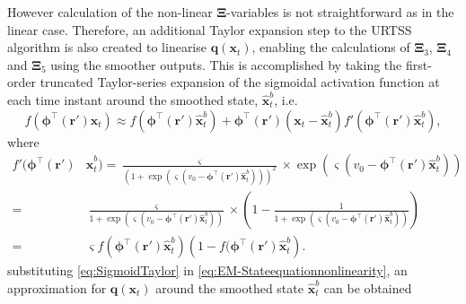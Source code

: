 \documentclass[]{article}
\begin{document}
However calculation of the non-linear $\boldsymbol\Xi$-variables is not straightforward as in the linear case. Therefore, an additional Taylor expansion step to the URTSS algorithm is also created to linearise $\mathbf q(\mathbf{x}_t)$, enabling the  calculations of $\boldsymbol\Xi_3$, $\boldsymbol\Xi_4$ and $\boldsymbol\Xi_5$ using the smoother outputs. This is accomplished by taking the first-order truncated Taylor-series expansion of the sigmoidal activation function at each time instant  around the smoothed state, $\hat{\mathbf x}_t^b$, i.e.
\begin{equation}\label{eq:SigmoidTaylor}
 f\left(\boldsymbol \phi^\top\left(\mathbf r'\right)\mathbf x_t\right) \approx f\left(\boldsymbol \phi^\top(\mathbf r')\hat{\mathbf x}_t^b\right)+  \boldsymbol \phi^\top\left(\mathbf r'\right)\left(\mathbf x_t - \hat{\mathbf x}_t^b\right)f'\left(\boldsymbol \phi^\top\left(\mathbf r'\right)\hat{\mathbf x}_t^b\right),
\end{equation}
where 
 \begin{align}\label{eq:SigmoidDerivative}
  f'(\boldsymbol \phi^\top\left(\mathbf r'\right)&\hat{\mathbf x}_t^b)= \frac{\varsigma}{\left(1 + \exp \left( \varsigma \left( v_0 - \boldsymbol \phi^\top\left(\mathbf r'\right)\hat{\mathbf x}_t^b \right) \right)\right)^2} \times \exp \left( \varsigma \left( v_0 - \boldsymbol \phi^\top\left(\mathbf r'\right)\hat{\mathbf x}_t^b \right) \right) \nonumber \\
 =&\frac{\varsigma}{1 + \exp \left( \varsigma \left( v_0 - \boldsymbol \phi^\top\left(\mathbf r'\right)\hat{\mathbf x}_t^b \right) \right)} \times \left(1-\frac{1}{1 + \exp \left( \varsigma \left( v_0 - \boldsymbol \phi^\top\left(\mathbf r'\right)\hat{\mathbf x}_t^b \right) \right)}\right) \nonumber \\
 =& \varsigma f(\boldsymbol \phi^\top\left(\mathbf r'\right)\hat{\mathbf x}_t^b)\left( 1-f(\boldsymbol \phi^\top\left(\mathbf r'\right)\hat{\mathbf x}_t^b\right).
 \end{align}
substituting \eqref{eq:SigmoidTaylor} in \eqref{eq:EM-Stateequationnonlinearity},  an approximation for $\mathbf q(\mathbf x_t)$ around the smoothed state $\hat{\mathbf{x}}_t^b$ can be obtained
\end{document}
